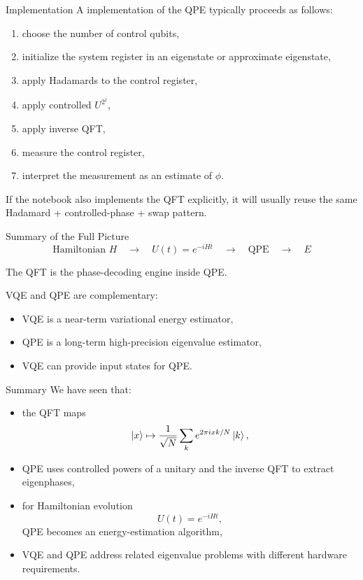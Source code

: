 \documentclass{beamer}
\begin{document}
\begin{frame}{Implementation}
A implementation of the QPE typically proceeds as follows:
\begin{enumerate}
\item choose the number of control qubits,
\item initialize the system register in an eigenstate or approximate eigenstate,
\item apply Hadamards to the control register,
\item apply controlled \(U^{2^j}\),
\item apply inverse QFT,
\item measure the control register,
\item interpret the measurement as an estimate of \(\phi\).
\end{enumerate}

If the notebook also implements the QFT explicitly, it will usually reuse the same Hadamard + controlled-phase + swap pattern.
\end{frame}

\begin{frame}{Summary of the Full Picture}
\[
\text{Hamiltonian } H
\quad \longrightarrow \quad
U(t)=e^{-iHt}
\quad \longrightarrow \quad
\text{QPE}
\quad \longrightarrow \quad
E
\]

The QFT is the phase-decoding engine inside QPE.

VQE and QPE are complementary:
\begin{itemize}
\item VQE is a near-term variational energy estimator,
\item QPE is a long-term high-precision eigenvalue estimator,
\item VQE can provide input states for QPE.
\end{itemize}
\end{frame}

\begin{frame}{Summary}
We have seen that:
\begin{itemize}
\item the QFT maps
\[
\ket{x}\mapsto \frac{1}{\sqrt N}\sum_k e^{2\pi i xk/N}\ket{k},
\]
\item QPE uses controlled powers of a unitary and the inverse QFT to extract eigenphases,
\item for Hamiltonian evolution
\[
U(t)=e^{-iHt},
\]
QPE becomes an energy-estimation algorithm,
\item VQE and QPE address related eigenvalue problems with different hardware requirements.
\end{itemize}
\end{frame}
\end{document}
